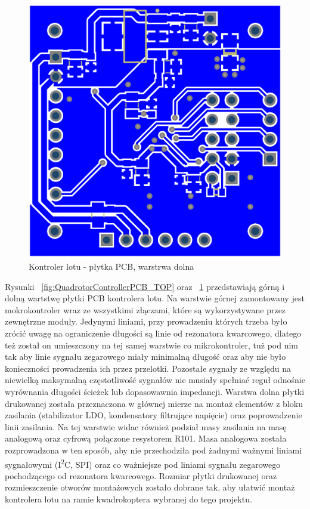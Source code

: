 \begin{figure}[H]
	\centering
	\includegraphics[scale=0.24]{Pictures/QuadrotorControllerPCB_Bottom.png}
		\caption[Kontroler lotu - płytka PCB, warstrwa dolna]{Kontroler lotu - płytka PCB, warstrwa dolna}
	\label{fig:QuadrotorControllerPCB_Bottom}
\end{figure}

Rysunki ~\ref{fig:QuadrotorControllerPCB_TOP} oraz ~\ref{fig:QuadrotorControllerPCB_Bottom} przedstawiają górną i dolną wartstwę płytki PCB kontrolera lotu. Na warstwie górnej zamontowany jest mokrokontroler wraz ze wszystkimi złączami, które są wykorzystywane przez zewnętrzne moduły. Jedynymi liniami, przy prowadzeniu których trzeba było zrócić uwagę na ograniczenie długości są linie od rezonatora kwarcowego, dlatego też został on umieszczony na tej samej warstwie co mikrokontroler, tuż pod nim tak aby linie sygnału zegarowego miały minimalną długość oraz aby nie było konieczności prowadzenia ich przez przelotki. Pozostałe sygnały ze względu na niewielką maksymalną częstotliwość sygnałów nie musiały spełniać reguł odnośnie wyrównania długości ścieżek lub dopasowawnia impedancji. Warstwa dolna płytki drukowanej została przeznaczona w głównej mierze na montaż elementów z bloku zasilania (stabilizator LDO, kondensatory filtrujące napięcie) oraz poprowadzenie linii zasilania. Na tej warstwie widac również podział masy zasilania na masę analogową oraz cyfrową połączone resystorem R101. Masa analogowa została rozprowadzona w ten sposób, aby nie przechodziła pod żadnymi ważnymi liniami sygnałowymi (I\textsuperscript{2}C, SPI) oraz co ważniejsze pod liniami sygnału zegarowego pochodzącego od rezonatora kwarcowego. Rozmiar płytki drukowanej oraz rozmieszczenie otworów montażowych zostało dobrane tak, aby ułatwić montaż kontrolera lotu na ramie kwadrokoptera wybranej do tego projektu.

